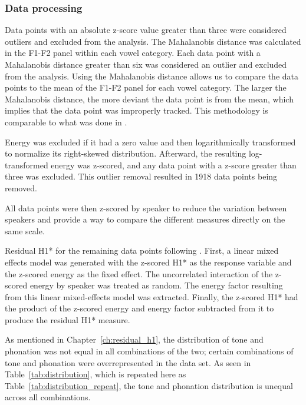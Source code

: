 \subsubsection{Data processing} \label{sec:data_processing}
Data points with an absolute z-score value greater than three were considered outliers and excluded from the analysis. The Mahalanobis distance was calculated in the F1-F2 panel within each vowel category. Each data point with a Mahalanobis distance greater than six was considered an outlier and excluded from the analysis. Using the Mahalanobis distance allows us to compare the data points to the mean of the F1-F2 panel for each vowel category. The larger the Mahalanobis distance, the more deviant the data point is from the mean, which implies that the data point was improperly tracked. This methodology is comparable to what was done in \citet{seyfarthPlosiveVoicingAcoustics2018,chaiCheckedSyllablesChecked2022,garellekPhoneticsWhiteHmong2023}.

Energy was excluded if it had a zero value and then logarithmically transformed to normalize its right-skewed distribution. Afterward, the resulting log-transformed energy was z-scored, and any data point with a z-score greater than three was excluded. This outlier removal resulted in 1918 data points being removed. 

All data points were then z-scored by speaker to reduce the variation between speakers and provide a way to compare the different measures directly on the same scale.

Residual H1* for the remaining data points following \citet{chaiH1H2AcousticMeasure2022}. First, a linear mixed effects model was generated with the z-scored H1* as the response variable and the z-scored energy as the fixed effect. The uncorrelated interaction of the z-scored energy by speaker was treated as random. The energy factor resulting from this linear mixed-effects model was extracted. Finally, the z-scored H1* had the product of the z-scored energy and energy factor subtracted from it to produce the residual H1* measure.

As mentioned in Chapter~\ref{ch:residual_h1}, the distribution of tone and phonation was not equal in all combinations of the two; certain combinations of tone and phonation were overrepresented in the data set. As seen in Table~\ref{tab:distribution}, which is repeated here as Table~\ref{tab:distribution_repeat}, the tone and phonation distribution is unequal across all combinations. 

